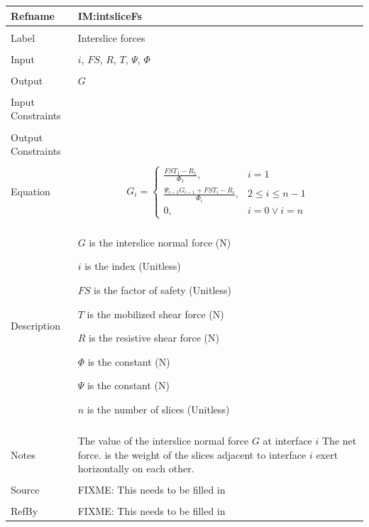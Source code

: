 \documentclass[12pt]{article}
\begin{document}
\noindent \begin{minipage}{\textwidth}
\begin{tabular}{p{} p{}}
\toprule \textbf{Refname} & \textbf{IM:intsliceFs}
\label{IM:intsliceFs}
\\ \midrule \\
Label & Interslice forces
\\ \midrule \\
Input & $i$, $FS$, $R$, $T$, $Ψ$, $Φ$
\\ \midrule \\
Output & $G$
\\ \midrule \\
Input Constraints & 
\\ \midrule \\
Output Constraints & 
\\ \midrule \\
Equation & \begin{dmath}
           G_{i}=\begin{cases}
\frac{FS T_{1}-R_{1}}{Φ_{1}}, & i=1\\
\frac{Ψ_{i-1} G_{i-1}+FS T_{i}-R_{i}}{Φ_{i}}, & 2\leq{}i\leq{}n-1\\
0, & i=0\lor{}i=n
\end{cases}
           \end{dmath}
\\ \midrule \\
Description & \begin{symbDescription}
              \item{$G$ is the interslice normal force (N)}
              \item{$i$ is the index (Unitless)}
              \item{$FS$ is the factor of safety (Unitless)}
              \item{$T$ is the mobilized shear force (N)}
              \item{$R$ is the resistive shear force (N)}
              \item{$Φ$ is the constant (N)}
              \item{$Ψ$ is the constant (N)}
              \item{$n$ is the number of slices (Unitless)}
              \end{symbDescription}
\\ \midrule \\
Notes & The value of the interslice normal force $G$ at interface $i$ The net force. is the weight of the slices adjacent to interface $i$ exert horizontally on each other.
\\ \midrule \\
Source & FIXME: This needs to be filled in
\\ \midrule \\
RefBy & FIXME: This needs to be filled in
\\ \bottomrule \end{tabular}
\end{minipage}\\
\end{document}

